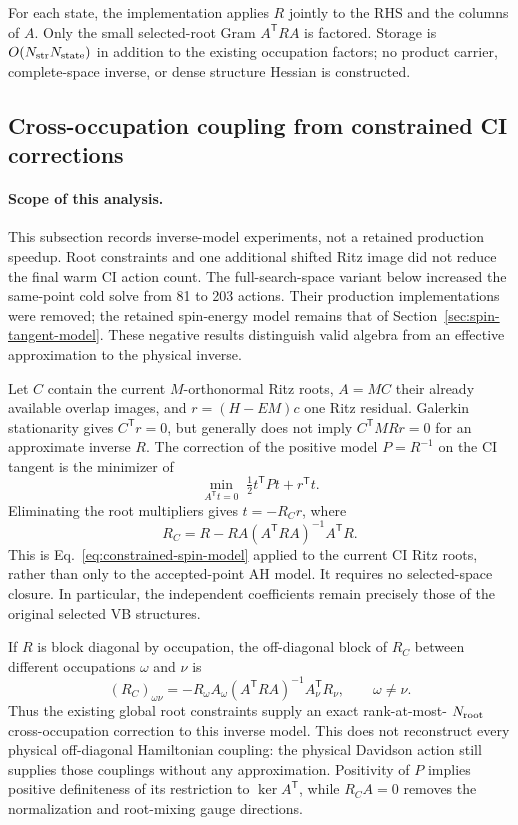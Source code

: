\documentclass[11pt,a4paper]{article}
\newcommand{\Tr}{^{\mathsf T}}
\begin{document}
For each state, the implementation applies $R$ jointly to the RHS and
the columns of $A$. Only the small selected-root Gram $A\Tr RA$ is
factored. Storage is $O(N_{\rm str}N_{\rm state})$ in addition to the
existing occupation factors; no product carrier, complete-space inverse,
or dense structure Hessian is constructed.

\subsection{Cross-occupation coupling from constrained CI corrections}
\label{sec:ci-constrained-model}

\paragraph{Scope of this analysis.}
This subsection records inverse-model experiments, not a retained production
speedup. Root constraints and one additional shifted Ritz image did not
reduce the final warm CI action count. The full-search-space variant below
increased the same-point cold solve from 81 to 203 actions. Their production
implementations were removed; the retained spin-energy model remains that
of Section~\ref{sec:spin-tangent-model}. These negative results distinguish
valid algebra from an effective approximation to the physical inverse.

Let $C$ contain the current $M$-orthonormal Ritz roots, $A=MC$ their
already available overlap images, and $r=(H-EM)c$ one Ritz residual.
Galerkin stationarity gives $C\Tr r=0$, but generally does not imply
$C\Tr M Rr=0$ for an approximate inverse $R$. The correction of the
positive model $P=R^{-1}$ on the CI tangent is the minimizer of
\begin{equation}
 \min_{A\Tr t=0}\; \tfrac12 t\Tr Pt+r\Tr t.
 \label{eq:ci-model-correction}
\end{equation}
Eliminating the root multipliers gives $t=-R_Cr$, where
\begin{equation}
 R_C=R-RA(A\Tr RA)^{-1}A\Tr R.
 \label{eq:ci-constrained-inverse}
\end{equation}
This is Eq.~\eqref{eq:constrained-spin-model} applied to the current CI
Ritz roots, rather than only to the accepted-point AH model. It requires
no selected-space closure. In particular, the independent coefficients
remain precisely those of the original selected VB structures.

If $R$ is block diagonal by occupation, the off-diagonal block of $R_C$
between different occupations $\omega$ and $\nu$ is
\begin{equation}
 (R_C)_{\omega\nu}
 =-R_\omega A_\omega (A\Tr RA)^{-1}A_\nu\Tr R_\nu,
 \qquad \omega\ne\nu.
 \label{eq:ci-occupation-bridge}
\end{equation}
Thus the existing global root constraints supply an exact rank-at-most-
$N_{\rm root}$ cross-occupation correction to this inverse model. This
does not reconstruct every physical off-diagonal Hamiltonian coupling:
the physical Davidson action still supplies those couplings without any
approximation. Positivity of $P$ implies positive definiteness of its
restriction to $\ker A\Tr$, while $R_C A=0$ removes the normalization and
root-mixing gauge directions.
\end{document}
